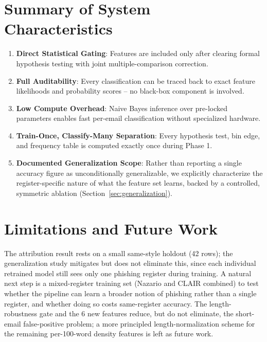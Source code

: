 \documentclass[11pt]{article}
\begin{document}
\section{Summary of System Characteristics}
\begin{enumerate}
    \item \textbf{Direct Statistical Gating}: Features are included only after clearing formal
      hypothesis testing with joint multiple-comparison correction.
    \item \textbf{Full Auditability}: Every classification can be traced back to exact feature
      likelihoods and probability scores -- no black-box component is involved.
    \item \textbf{Low Compute Overhead}: Naive Bayes inference over pre-locked parameters enables
      fast per-email classification without specialized hardware.
    \item \textbf{Train-Once, Classify-Many Separation}: Every hypothesis test, bin edge, and
      frequency table is computed exactly once during Phase 1.
    \item \textbf{Documented Generalization Scope}: Rather than reporting a single accuracy figure
      as unconditionally generalizable, we explicitly characterize the register-specific nature of
      what the feature set learns, backed by a controlled, symmetric ablation
      (Section~\ref{sec:generalization}).
\end{enumerate}

\section{Limitations and Future Work}
The attribution result rests on a small same-style holdout (42 rows); the generalization study
mitigates but does not eliminate this, since each individual retrained model still sees only one
phishing register during training. A natural next step is a mixed-register training set (Nazario
and CLAIR combined) to test whether the pipeline can learn a broader notion of phishing rather
than a single register, and whether doing so costs same-register accuracy. The length-robustness
gate and the 6 new features reduce, but do not eliminate, the short-email false-positive problem;
a more principled length-normalization scheme for the remaining per-100-word density features is
left as future work.
\end{document}
